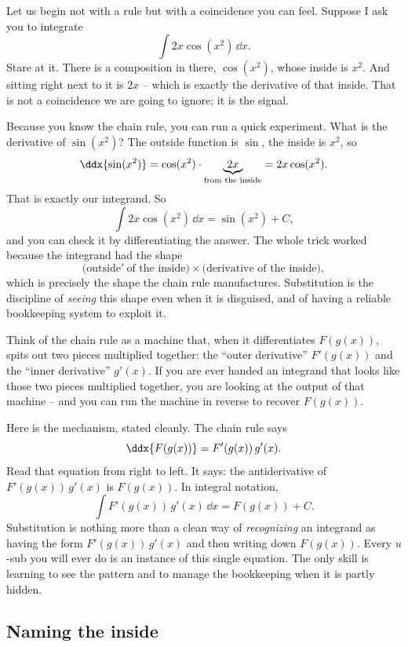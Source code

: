 Let us begin not with a rule but with a coincidence you can feel. Suppose I ask
you to integrate
\[
  \int 2x\cos\!\left(x^2\right)\,\dd x.
\]
Stare at it. There is a composition in there, $\cos(x^2)$, whose inside is $x^2$.
And sitting right next to it is $2x$ -- which is exactly the derivative of that
inside. That is not a coincidence we are going to ignore; it is the signal.

Because you know the chain rule, you can run a quick experiment. What is the
derivative of $\sin(x^2)$? The outside function is $\sin$, the inside is $x^2$, so
\[
  \ddx{\sin(x^2)} = \cos(x^2)\cdot \underbrace{2x}_{\text{from the inside}}
                  = 2x\cos(x^2).
\]
That is exactly our integrand. So
\[
  \int 2x\cos\!\left(x^2\right)\,\dd x = \sin(x^2) + C,
\]
and you can check it by differentiating the answer. The whole trick worked
because the integrand had the shape
\[
  \big(\text{outside}'\ \text{of the inside}\big)\times\big(\text{derivative of the inside}\big),
\]
which is precisely the shape the chain rule manufactures. Substitution is the
discipline of \emph{seeing} this shape even when it is disguised, and of having a
reliable bookkeeping system to exploit it.

\begin{intuitionbox}
Think of the chain rule as a machine that, when it differentiates $F(g(x))$, spits
out two pieces multiplied together: the ``outer derivative'' $F'(g(x))$ and the
``inner derivative'' $g'(x)$. If you are ever handed an integrand that looks like
those two pieces multiplied together, you are looking at the output of that machine
-- and you can run the machine in reverse to recover $F(g(x))$.
\end{intuitionbox}

\begin{whybox}
Here is the mechanism, stated cleanly. The chain rule says
\[
  \ddx{F(g(x))} = F'(g(x))\,g'(x).
\]
Read that equation from right to left. It says: the antiderivative of
$F'(g(x))\,g'(x)$ is $F(g(x))$. In integral notation,
\[
  \int F'(g(x))\,g'(x)\,\dd x = F(g(x)) + C.
\]
Substitution is nothing more than a clean way of \emph{recognizing} an integrand as
having the form $F'(g(x))\,g'(x)$ and then writing down $F(g(x))$. Every $u$-sub you
will ever do is an instance of this single equation. The only skill is learning to
see the pattern and to manage the bookkeeping when it is partly hidden.
\end{whybox}

\subsection{Naming the inside}

